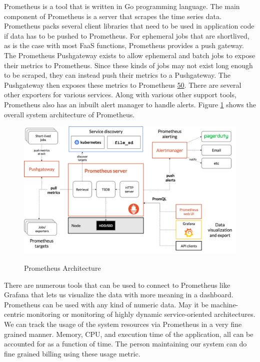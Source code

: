\documentclass[12pt,titlepage]{article}
\begin{document}
Prometheus is a tool that is written in Go programming language. The main
component of Prometheus is a server that scrapes the time series data.
Prometheus packs several client libraries that need to be used in application
code if data has to be pushed to Prometheus. For ephemeral jobs that are
shortlived, as is the case with most FaaS functions, Prometheus provides a push
gateway. The Prometheus Pushgateway exists to allow ephemeral and batch jobs to expose
their metrics to Prometheus. Since these kinds of jobs may not exist long enough
to be scraped, they can instead push their metrics to a Pushgateway. The
Pushgateway then exposes these metrics to Prometheus \hyperref[ref:50]{50}. There are
several other exporters for various services. Along with various other support
tools, Prometheus also has an inbuilt alert manager to handle alerts. Figure \ref{fig:prometheus}
shows the overall system architecture of Prometheus.

\begin{figure}[!h]
    \caption{Prometheus Architecture}
    \centering
    \includegraphics[width=130mm]{./thesis_images/prometheus.png}
    \label{fig:prometheus}
\end{figure}

There are numerous tools that can be used to connect to Prometheus like Grafana
that lets us visualize the data with more meaning in a dashboard. Prometheus can
be used with any kind of numeric data. May it be machine-centric monitoring or
monitoring of highly dynamic service-oriented architectures. We can track the
usage of the system resources via Prometheus in a very fine grained manner.
Memory, CPU, and execution time of the application, all can be accounted for as
a function of time. The person maintaining our system can do fine grained
billing using these usage metric.
\end{document}
